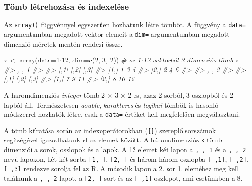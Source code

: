 \documentclass[
]{book}
\newenvironment{Shaded}{\begin{snugshade}}{\end{snugshade}}
\newcommand{\AttributeTok}[1]{\textcolor[rgb]{0.77,0.63,0.00}{#1}}
\newcommand{\CommentTok}[1]{\textcolor[rgb]{0.56,0.35,0.01}{\textit{#1}}}
\newcommand{\DecValTok}[1]{\textcolor[rgb]{0.00,0.00,0.81}{#1}}
\newcommand{\FunctionTok}[1]{\textcolor[rgb]{0.00,0.00,0.00}{#1}}
\newcommand{\NormalTok}[1]{#1}
\newcommand{\OtherTok}[1]{\textcolor[rgb]{0.56,0.35,0.01}{#1}}
\newcommand{\SpecialCharTok}[1]{\textcolor[rgb]{0.00,0.00,0.00}{#1}}
\begin{document}
\hypertarget{tuxf6mb-luxe9trehozuxe1sa-uxe9s-indexeluxe9se}{%
\subsubsection{Tömb létrehozása és indexelése}\label{tuxf6mb-luxe9trehozuxe1sa-uxe9s-indexeluxe9se}}

Az \texttt{array()} függvénnyel egyszerűen hozhatunk létre tömböt. A függvény a \texttt{data=} argumentumban megadott vektor elemeit a \texttt{dim=} argumentumban megadott dimenzió-méretek mentén rendezi össze.

\begin{Shaded}
\begin{Highlighting}[]
\NormalTok{x }\OtherTok{\textless{}{-}} \FunctionTok{array}\NormalTok{(}\AttributeTok{data=}\DecValTok{1}\SpecialCharTok{:}\DecValTok{12}\NormalTok{, }\AttributeTok{dim=}\FunctionTok{c}\NormalTok{(}\DecValTok{2}\NormalTok{, }\DecValTok{3}\NormalTok{, }\DecValTok{2}\NormalTok{)) }\CommentTok{\# az 1:12 vektorból 3 dimenziós tömb }
\NormalTok{x                       }
\CommentTok{\#\textgreater{} , , 1}
\CommentTok{\#\textgreater{} }
\CommentTok{\#\textgreater{}      [,1] [,2] [,3]}
\CommentTok{\#\textgreater{} [1,]    1    3    5}
\CommentTok{\#\textgreater{} [2,]    2    4    6}
\CommentTok{\#\textgreater{} }
\CommentTok{\#\textgreater{} , , 2}
\CommentTok{\#\textgreater{} }
\CommentTok{\#\textgreater{}      [,1] [,2] [,3]}
\CommentTok{\#\textgreater{} [1,]    7    9   11}
\CommentTok{\#\textgreater{} [2,]    8   10   12}
\end{Highlighting}
\end{Shaded}

A háromdimenziós \emph{integer} tömb 2 \(\times\) 3 \(\times\) 2-es, azaz 2 sorból, 3 oszlopból és 2 lapból áll. Természetesen \emph{double}, \emph{karakteres} és \emph{logikai} tömbök is hasonló módszerrel hozhatók létre, csak a \texttt{data=} értéket kell megfelelően megválasztani.

A tömb kiíratása során az indexoperátorokban (\texttt{{[}{]}}) szereplő sorszámok segítségével igazodhatunk el az elemek között. A háromdimenziós \texttt{x} tömb dimenziói a sorok, oszlopok és a lapok. A 12 elemet két lapon a \texttt{,\ ,\ 1} és a \texttt{,\ ,\ 2} nevű lapokon, két-két sorba \texttt{{[}1,\ {]}}, \texttt{{[}2,\ {]}} és három-három oszlopba \texttt{{[}\ ,1{]}}, \texttt{{[}\ ,2{]}}, \texttt{{[}\ ,3{]}} rendezve sorolja fel az R. A második lapon a 2. sor 1. eleméhez meg kell találnunk a \texttt{,\ ,\ 2} lapot, a \texttt{{[}2,\ {]}} sort és az \texttt{{[}\ ,1{]}} oszlopot, ami esetünkben a 8.
\end{document}
